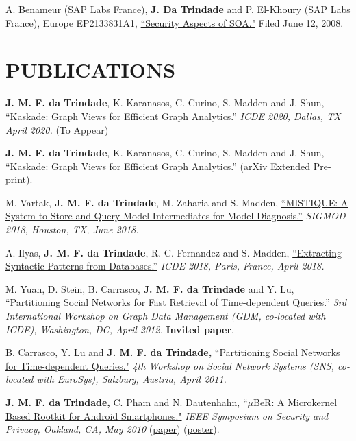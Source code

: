 \documentclass[line,margin]{res}
\begin{document}
\begin{resume}
A. Benameur (SAP Labs France), \textbf{J. Da Trindade} and P. El-Khoury (SAP Labs France), Europe EP2133831A1, \href{http://www.freepatentsonline.com/EP2133831B1.html}{``Security Aspects of SOA."}  Filed June 12, 2008.

\section{PUBLICATIONS}
\textbf{J. M. F. da Trindade}, K. Karanasos, C. Curino, S. Madden and J. Shun, \href{https://arxiv.org/abs/1906.05162}{``Kaskade: Graph Views for Efficient Graph Analytics.''} \textit{ICDE 2020, Dallas, TX April 2020.} (To Appear)

\textbf{J. M. F. da Trindade}, K. Karanasos, C. Curino, S. Madden and J. Shun, \href{https://arxiv.org/abs/1906.05162}{``Kaskade: Graph Views for Efficient Graph Analytics.''} (arXiv Extended Pre-print).

M. Vartak, \textbf{J. M. F. da Trindade}, M. Zaharia and S. Madden, \href{https://cs.stanford.edu/~matei/papers/2018/sigmod_mistique.pdf}{``MISTIQUE: A System to Store and Query Model Intermediates for Model Diagnosis.''} \textit{SIGMOD 2018, Houston, TX, June 2018.}

A. Ilyas, \textbf{J. M. F. da Trindade}, R. C. Fernandez and S. Madden, \href{https://arxiv.org/pdf/1710.11528.pdf}{``Extracting Syntactic Patterns from Databases.''} \textit{ICDE 2018, Paris, France, April 2018.}

M. Yuan, D. Stein, B. Carrasco, \textbf{J. M. F. da Trindade} and Y. Lu, \href{http://joanatrindade.wdfiles.com/local--files/curriculum/gdm2012-paper.pdf}{``Partitioning Social Networks for Fast Retrieval of Time-dependent Queries.''} \textit{3rd International Workshop on Graph Data Management (GDM, co-located with ICDE), Washington, DC, April 2012.} \textbf{Invited paper}.

B. Carrasco, Y. Lu and \textbf{J. M. F. da Trindade,} \href{http://research.microsoft.com/en-us/projects/ldg/a04-carrasco.pdf}{``Partitioning Social Networks for Time-dependent Queries."} \textit{4th Workshop on Social Network Systems (SNS, co-located with EuroSys), Salzburg, Austria, April 2011.}

\textbf{J. M. F. da Trindade,} C. Pham and N. Dautenhahn, \href{http://joanatrindade.wikidot.com/local--files/curriculum/oakland2010-paper.pdf}{``$\mu$BeR: A Microkernel Based Rootkit for Android Smartphones."} \textit{IEEE Symposium on Security and Privacy, Oakland, CA, May 2010} (\href{http://joanatrindade.wikidot.com/local--files/curriculum/oakland2010-paper.pdf}{paper}) (\href{http://joanatrindade.wikidot.com/local--files/curriculum/oakland2010-poster.pdf}{poster}).


\end{resume}
\end{document}
